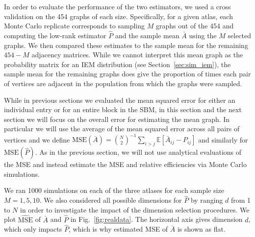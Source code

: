 \documentclass[10pt,letterpaper]{article}
\newcommand{\Ex}{\mathbb{E}}
\renewcommand{\hat}{\widehat}
\begin{document}
In order to evaluate the performance of the two estimators, we used a cross validation on the 454 graphs of each size. 
Specifically, for a given atlas, each Monte Carlo replicate corresponds to sampling $M$ graphs out of the 454 and computing the low-rank estimator $\hat{P}$ and the sample mean $\bar{A}$ using the $M$ selected graphs. 
We then compared these estimates to the sample mean for the remaining $454-M$ adjacency matrices.
While we cannot interpret this mean graph as the probability matrix for an IEM distribution (see Section~\ref{sec:sim_iem}), the sample mean for the remaining graphs does give the proportion of times each pair of vertices are adjacent in the population from which the graphs were sampled.

While in previous sections we evaluated the mean squared error for either an individual entry or for an entire block in the SBM, in this section and the next section we will focus on the overall error for estimating the mean graph.
In particular we will use the average of the mean squared error across all pairs of vertices and we define $\mathrm{MSE}(\bar{A}) = \binom{N}{2}^{-1} \sum_{i>j}\Ex[\bar{A}_{ij}-P_{ij}]$ and similarly for $\mathrm{MSE}(\hat{P})$.
As in the previous section, we will not use analytical evaluations of the MSE and instead estimate the MSE and relative efficiencies via Monte Carlo simulations.

We ran 1000 simulations on each of the three atlases for each sample size $M=1,5,10$.
We also considered all possible dimensions for $\hat{P}$ by ranging $d$ from 1 to $N$ in order to investigate the impact of the dimension selection procedures.
We plot $\hat{\mathrm{MSE}}$ of $\bar{A}$ and $\hat{P}$ in Fig.~\ref{fig:realdata}.
The horizontal axis gives dimension $d$, which only impacts $\hat{P}$, which is why estimated MSE of $\bar{A}$ is shown as flat.
\end{document}
